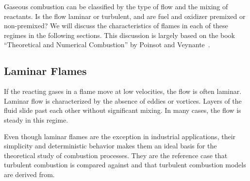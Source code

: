 %
Gaseous combustion can be classified by the type of flow and the mixing of
reactants.
%
Is the flow laminar or turbulent, and are fuel and oxidizer premixed or
non-premixed?
%
We will discuss the characteristics of flames in each of these regimes in the
following sections.
%
This discussion is largely based on the book ``Theoretical and Numerical
Combustion'' by Poinsot and Veynante~\cite{Poinsot2012}.
%
\subsection{Laminar Flames} %
\label{sub:laminar_flames}
%
If the reacting gases in a flame move at low velocities, the flow is often
laminar.
%
Laminar flow is characterized by the absence of eddies or vortices.
%
Layers of the fluid slide past each other without significant mixing.
%
In many cases, the flow is steady in this regime.
%

%
Even though laminar flames are the exception in industrial applications, their
simplicity and deterministic behavior makes them an ideal basis for the
theoretical study of combustion processes.
%
They are the reference case that turbulent combustion is compared against and
that turbulent combustion models are derived from.
%
